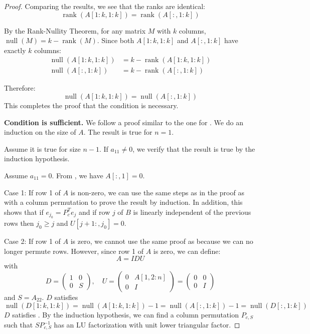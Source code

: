 \documentclass[10pt,twoside]{siamart1116}
\DeclareMathOperator{\rk}{rank}
\DeclareMathOperator{\nl}{null}
\numberwithin{theorem}{section}
\begin{document}
\begin{proof}
	Comparing the results, we see that the ranks are identical:
	\[ \rk(A[1:k, 1:k]) = \rk(A[:, 1:k]) \]

	By the Rank-Nullity Theorem, for any matrix $M$ with $k$ columns, $\nl(M) = k - \rk(M)$. Since both $A[1:k, 1:k]$ and $A[:, 1:k]$ have exactly $k$ columns:
	\begin{align*}
		\nl(A[1:k, 1:k]) & = k - \rk(A[1:k, 1:k]) \\
		\nl(A[:, 1:k])   & = k - \rk(A[:, 1:k])
	\end{align*}

	Therefore:
	\[ \nl(A[1:k, 1:k]) = \nl(A[:, 1:k]) \]
	This completes the proof that the condition is necessary.

	\noindent\textbf{Condition is sufficient.} \quad We follow a proof similar to the one for . We do an induction on the size of $A$. The result is true for $n=1$.

	Assume it is true for size $n-1$. If $a_{11} \neq 0$, we verify that the result is true by the induction hypothesis.

	Assume $a_{11} = 0$. From , we have $A[:,1] = 0$.

	Case 1: If row 1 of $A$ is non-zero, we can use the same steps as in the proof as  with a column permutation to prove the result by induction. In addition, this shows that if $e_{j_0} = P_c^T e_j$ and if row $j$ of $B$ is linearly independent of the previous rows then $j_0 \ge j$ and $U[j+1:,j_0] = 0$.

	Case 2: If row 1 of $A$ is zero, we cannot use the same proof as  because we can no longer permute rows. However, since row 1 of $A$ is zero, we can define:
	\[
		A = IDU
	\]
	with
	\[
		D = \begin{pmatrix}
			1 & 0 \\
			0 & S
		\end{pmatrix}, \quad
		U = \begin{pmatrix}
			0 & A[1,2:n] \\
			0 & I
		\end{pmatrix} = \begin{pmatrix}
			0 & 0 \\
			0 & I
		\end{pmatrix}
	\]
	and $S=A_{22}$. $D$ satisfies
	\[
		\nl(D[1:k,1:k]) = \nl(A[1:k,1:k]) - 1
		= \nl(A[:,1:k]) - 1 = \nl(D[:,1:k])
	\]
	$D$ satisfies . By the induction hypothesis, we can find a column permutation $P_{c,S}$ such that $S P_{c,S}^{-1}$ has an LU factorization with unit lower triangular factor.


\end{proof}
\end{document}
